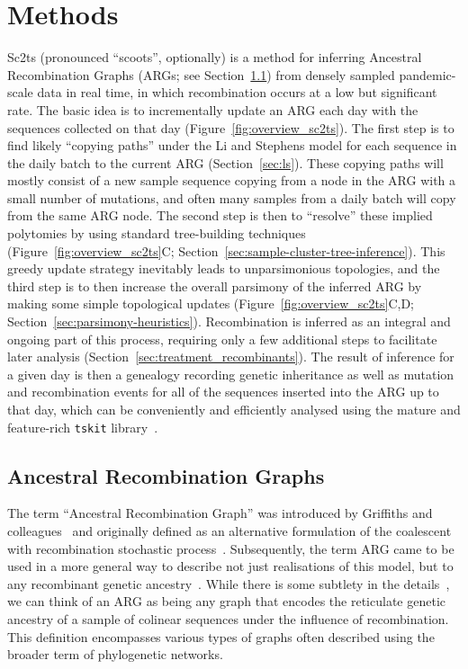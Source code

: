 \documentclass{article}
\begin{document}
\section{Methods}
Sc2ts (pronounced ``scoots'', optionally) is a method for inferring
Ancestral Recombination Graphs (ARGs; see Section~\ref{sec:args})
from densely sampled pandemic-scale data
in real time, in which recombination occurs at a low but significant rate.
The basic idea is to incrementally update an ARG each day
with the sequences collected on that day (Figure~\ref{fig:overview_sc2ts}).
The first step is to find likely ``copying paths'' under the Li and Stephens model
for each sequence in the daily batch to the current ARG (Section~\ref{sec:ls}).
These copying paths
will mostly consist of a new sample sequence copying from a node in the ARG
with a small number of mutations, and often many samples
from a daily batch will copy from the same ARG node.
The second step is then to ``resolve'' these implied polytomies by using
standard tree-building techniques (Figure~\ref{fig:overview_sc2ts}C;
Section~\ref{sec:sample-cluster-tree-inference}).
This greedy update strategy inevitably leads to unparsimonious
topologies, and the third step is to then increase the
overall parsimony of the inferred ARG by making some simple topological
updates (Figure~\ref{fig:overview_sc2ts}C,D;
Section~\ref{sec:parsimony-heuristics}).
Recombination is inferred as an integral and ongoing part of this
process, requiring only a few additional steps to facilitate
later analysis (Section~\ref{sec:treatment_recombinants}).
The result of inference for a given day is then
a genealogy recording genetic inheritance as well as
mutation and recombination events
for all of the sequences inserted into the ARG up to that day,
which can be conveniently and efficiently analysed using the
mature and feature-rich
\texttt{tskit}
library~\citep{Kelleher2018-xc,Ralph2020-efficiently,Tskit2023-tskit}.

\subsection{Ancestral Recombination Graphs}
\label{sec:args}
The term ``Ancestral Recombination Graph'' was introduced by
Griffiths and colleagues~\citep{Griffiths1991-two,Griffiths1998-ancestral}
and originally defined as an alternative formulation of the coalescent
with recombination stochastic process~\citep{Hudson1983-properties}.
Subsequently, the term ARG came to be used in a more general way to
describe not just realisations of this model, but to any
recombinant genetic ancestry~\citep{Minichiello2006-mapping,Zhang2023-lf}.
While there is some subtlety in the details~\citep{Wong2023-efficient},
we can think of an ARG as being any graph that encodes the
reticulate genetic ancestry of a sample of colinear sequences under
the influence of recombination.
This definition encompasses various types of graphs often
described using the broader term of phylogenetic networks.
\end{document}
